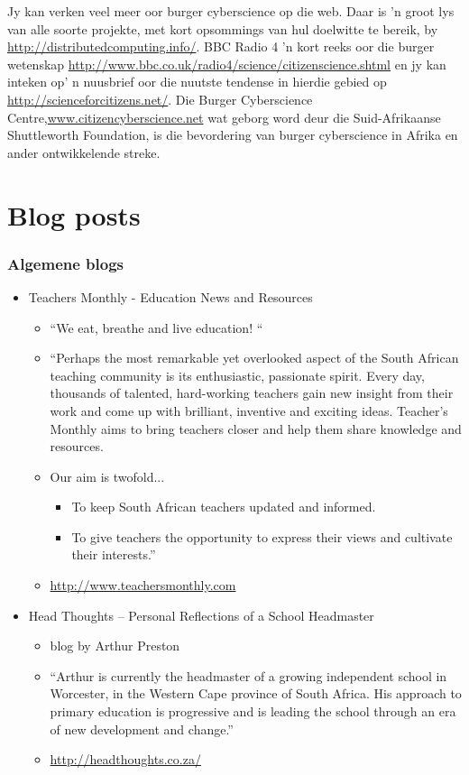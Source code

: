 Jy kan verken veel meer oor burger cyberscience op die web. Daar is 'n groot lys van alle soorte projekte, met kort opsommings van hul doelwitte te bereik, by \underline{http://distributedcomputing.info/}. BBC Radio 4 'n kort reeks oor die burger wetenskap \underline{http://www.bbc.co.uk/radio4/science/citizenscience.shtml}  en jy kan inteken op' n nuusbrief oor die nuutste tendense in hierdie gebied op \newline \underline{http://scienceforcitizens.net/}. Die Burger Cyberscience Centre,\underline{www.citizencyberscience.net}  wat geborg word deur die Suid-Afrikaanse Shuttleworth Foundation, is die bevordering van burger cyberscience in Afrika en ander ontwikkelende streke. 


\section{Blog posts}
\subsubsection{Algemene blogs}
\begin{itemize}
\item Teachers Monthly - Education News and Resources
    \begin{itemize}[noitemsep]
      \item “We eat, breathe and live education! “
      \item “Perhaps the most remarkable yet overlooked aspect of the South African teaching community is its enthusiastic, passionate spirit. Every day, thousands of talented, hard-working teachers gain new insight from their work and come up with brilliant, inventive and exciting ideas. Teacher’s Monthly aims to bring teachers closer and help them share knowledge and resources.
      \item Our aim is twofold...
	    \begin{itemize}[noitemsep]
	      \item To keep South African teachers updated and informed.
	    \item To give teachers the opportunity to express their views and cultivate their interests.”
	    \end{itemize}
      \item \underline{http://www.teachersmonthly.com }
    \end{itemize}

\item Head Thoughts – Personal Reflections of a School Headmaster
    \begin{itemize}[noitemsep]
	\item blog by Arthur Preston
	\item “Arthur is currently the headmaster of a growing independent school in Worcester, in the Western Cape province of South Africa. His approach to primary education is progressive and is leading the school through an era of new development and change.”
\item \underline{http://headthoughts.co.za/ }
    \end{itemize}
\end{itemize}

